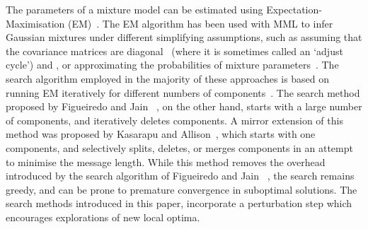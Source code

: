 \documentclass{elsarticle}
\begin{document}


The parameters of a mixture model can be estimated using Expectation-Maximisation 
(EM)~\cite{dempster1977maximum}. The EM algorithm has been used with MML to 
infer Gaussian mixtures under different simplifying assumptions, such as 
assuming that the covariance matrices are diagonal~\cite{WallaceDowe1994b, WallaceDowe1997a, WallaceDowe2000} 
(where it is sometimes called an `adjust cycle') and \cite{oliver1996unsupervised},
or approximating the probabilities of mixture parameters~\cite{figueiredo2002unsupervised,roberts1998bayesian}. 
The search algorithm employed in the majority of these approaches is based on 
running EM iteratively for different numbers of components~\cite{WallaceDowe1994b, 
WallaceDowe1997a, WallaceDowe2000, oliver1996unsupervised,roberts1998bayesian,
biernacki2000assessing}. The search method proposed by Figueiredo and Jain
~\cite{figueiredo2002unsupervised}, on the other hand, starts with a large 
number of components, and iteratively deletes components. A mirror extension 
of this method was proposed by Kasarapu and Allison~\cite{kasarapu2015minimum}, 
which starts with one components, and selectively splits, deletes, or merges 
components in an attempt to minimise the message length. While this method 
removes the overhead introduced by the search algorithm of Figueiredo and Jain
~\cite{figueiredo2002unsupervised}, the search remains greedy, and can be 
prone to premature convergence in suboptimal solutions. The search methods 
introduced in this paper, incorporate a perturbation step which encourages 
explorations of new local optima.
\end{document}

